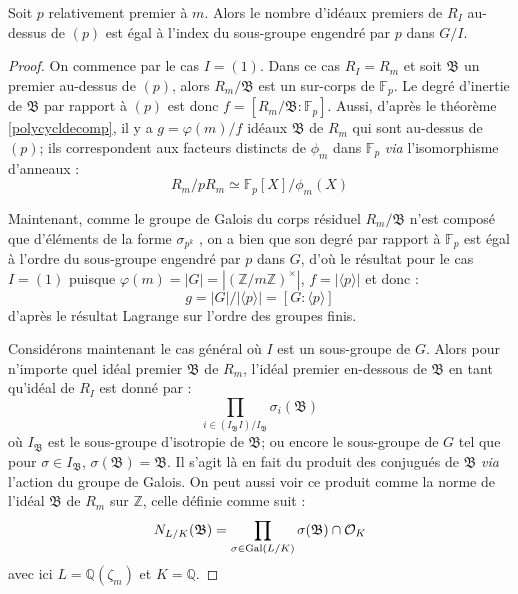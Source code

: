 \documentclass[a4paper]{article} %
\numberwithin{equation}{section}
\newcommand\zmodn[1]{\mathbb{Z}/#1\mathbb{Z}}
\begin{document}
\begin{lem}
Soit $p$ relativement premier à $m$. Alors le nombre d'idéaux premiers de $R_I$ au-dessus de $(p)$ est égal à l'index du sous-groupe engendré par $p$ dans $G/I$.
\end{lem}
\begin{proof}
On commence par le cas $I = (1)$. Dans ce cas $R_I = R_m$ et soit $\mathfrak{B}$ un premier au-dessus de $(p)$, alors $R_m/\mathfrak{B}$ est un sur-corps de $\mathbb{F}_p$. Le degré d'inertie de $\mathfrak{B}$ par rapport à $(p)$ est donc $f = [R_m/\mathfrak{B}:\mathbb{F}_p]$. Aussi, d'après le théorème \ref{polycycldecomp}, il y a $g = \varphi(m)/f$ idéaux $\mathfrak{B}$ de $R_m$ qui sont au-dessus de $(p)$; ils correspondent aux facteurs distincts de $\phi_m$ dans $\mathbb{F}_p$ \textit{via} l'isomorphisme d'anneaux :
\[R_m/pR_m \simeq \mathbb{F}_p[X]/\phi_m(X)\]\par
 Maintenant, comme le groupe de Galois du corps résiduel $R_m/\mathfrak{B}$ n'est composé que d'éléments de la forme $\sigma_{p^k}$ %
, on a bien que son degré par rapport à $\mathbb{F}_p$ est égal à l'ordre du sous-groupe engendré par $p$ dans $G$, d'où le résultat pour le cas $I = (1)$ puisque $\varphi(m) = |G| = |(\zmodn{m})^{\times}|$, $f = |\langle p\rangle|$ et donc :
\[g = |G|/|\langle p\rangle| = [G:\langle p\rangle]\]
d'après le résultat Lagrange sur l'ordre des groupes finis.\par
Considérons maintenant le cas général où $I$ est un sous-groupe de $G$. Alors pour n'importe quel idéal premier $\mathfrak{B}$ de $R_m$, l'idéal premier en-dessous de $\mathfrak{B}$ en tant qu'idéal de $R_I$ est donné par :
\[\prod_{i\in(I_{\mathfrak{B}}I)/I_{\mathfrak{B}}}{\sigma_i(\mathfrak{B})}\]
où $I_{\mathfrak{B}}$ est le sous-groupe d'isotropie de $\mathfrak{B}$; ou encore le sous-groupe de $G$ tel que pour $\sigma\in I_{\mathfrak{B}}$, $\sigma(\mathfrak{B}) = \mathfrak{B}$. Il s'agit là en fait du produit des conjugués de $\mathfrak{B}$ \textit{via} l'action du groupe de Galois. On peut aussi voir ce produit comme la norme de l'idéal $\mathfrak{B}$ de $R_m$ sur $\mathbb{Z}$, celle définie comme suit : 
\[N_{L/K}(\mathfrak{B}) = \prod_{\sigma\in\textup{Gal}(L/K)}{\sigma(\mathfrak{B})\cap\mathcal{O}_K}\]
avec ici $L = \mathbb{Q}(\zeta_m)$ et $K = \mathbb{Q}$.
\end{proof}
\end{document}

